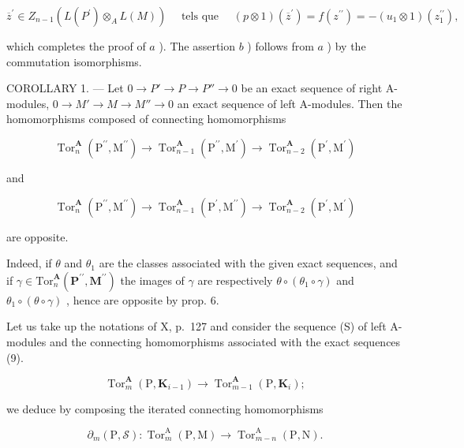 \[
\overline {{{z}}} ^ {\prime} \in Z _ {n - 1} (L (P ^ {\prime}) \otimes_ {A} L (M)) \quad \text { tels   que } \quad (p \otimes 1) (\overline {{{z}}} ^ {\prime}) = f (z ^ {\prime \prime}) = - (u _ {1} \otimes 1) (z _ {1} ^ {\prime \prime}),
\]

which completes the proof of \(a\) ). The assertion \(b\) ) follows from \(a\) ) by the commutation isomorphisms.

COROLLARY 1. --- Let \(0 \to P' \to P \to P'' \to 0\) be an exact sequence of right A-modules, \(0 \to M' \to M \to M'' \to 0\) an exact sequence of left A-modules. Then the homomorphisms composed of connecting homomorphisms

\[
\operatorname{Tor} _ {n} ^ {\mathbf {A}} \left(\mathrm{P} ^ {\prime \prime}, \mathrm{M} ^ {\prime \prime}\right)\rightarrow \operatorname{Tor} _ {n - 1} ^ {\mathbf {A}} \left(\mathrm{P} ^ {\prime \prime}, \mathrm{M} ^ {\prime}\right)\rightarrow \operatorname{Tor} _ {n - 2} ^ {\mathbf {A}} \left(\mathrm{P} ^ {\prime}, \mathrm{M} ^ {\prime}\right)
\]

and

\[
\operatorname{Tor} _ {n} ^ {\mathbf {A}} \left(\mathrm{P} ^ {\prime \prime}, \mathrm{M} ^ {\prime \prime}\right)\rightarrow \operatorname{Tor} _ {n - 1} ^ {\mathbf {A}} \left(\mathrm{P} ^ {\prime}, \mathrm{M} ^ {\prime \prime}\right)\rightarrow \operatorname{Tor} _ {n - 2} ^ {\mathbf {A}} \left(\mathrm{P} ^ {\prime}, \mathrm{M} ^ {\prime}\right)
\]

are opposite.

Indeed, if \(\theta\) and \(\theta_{1}\) are the classes associated with the given exact sequences, and if \(\gamma\in\mathrm{Tor}_{n}^{\mathbf{A}}(\mathbf{P}^{\prime\prime},\mathbf{M}^{\prime\prime})\) the images of \(\gamma\) are respectively \(\theta\circ(\theta_{1}\circ\gamma)\) and \(\theta_{1}\circ(\theta\circ\gamma)\) , hence are opposite by prop. 6.

Let us take up the notations of X, p.~127 and consider the sequence (S) of left A-modules and the connecting homomorphisms associated with the exact sequences (9).

\[
\operatorname{Tor} _ {m} ^ {\mathbf {A}} \left(\mathrm{P}, \mathbf {K} _ {i - 1}\right)\rightarrow \operatorname{Tor} _ {m - 1} ^ {\mathbf {A}} \left(\mathrm{P}, \mathbf {K} _ {i}\right);
\]

we deduce by composing the iterated connecting homomorphisms

\[
\partial_ {m} (\mathrm{P}, \mathscr {S}): \operatorname{Tor} _ {m} ^ {\mathrm{A}} (\mathrm{P}, \mathrm{M}) \rightarrow \operatorname{Tor} _ {m - n} ^ {\mathrm{A}} (\mathrm{P}, \mathrm{N}).
\]

